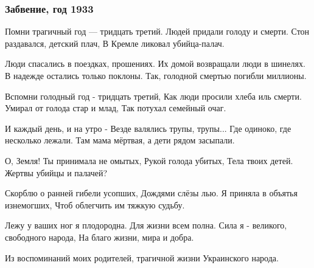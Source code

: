  
 
 

\subsubsection{Забвение, год 1933}
\label{sec:poetry.rus.sokor.zabvenie_god_33}

Помни трагичный год --- тридцать третий.
Людей придали голоду и смерти.
Стон раздавался, детский плач,
В Кремле ликовал убийца-палач.

Люди спасались в поездках, прошениях.
Их домой возвращали люди в шинелях.
В надежде остались только поклоны.
Так, голодной смертью погибли миллионы.

Вспомни голодный год - тридцать третий,
Как люди просили хлеба иль смерти.
Умирал от голода стар и млад,
Так потухал семейный очаг.

И каждый день, и на утро -
Везде валялись трупы, трупы...
Где одиноко, где несколько лежали.
Там мама мёртвая, а дети рядом засыпали.

О, Земля! Ты принимала не омытых,
Рукой голода убитых,
Тела твоих детей.
Жертвы убийцы и палачей?

Скорблю о ранней гибели усопших,
Дождями слёзы лью.
Я приняла в объятья изнемогших,
Чтоб облегчить им тяжкую судьбу.

Лежу у ваших ног я плодородна.
Для жизни всем полна.
Сила я - великого, свободного народа,
На благо жизни, мира и добра.

Из воспоминаний моих родителей, трагичной жизни Украинского народа.

